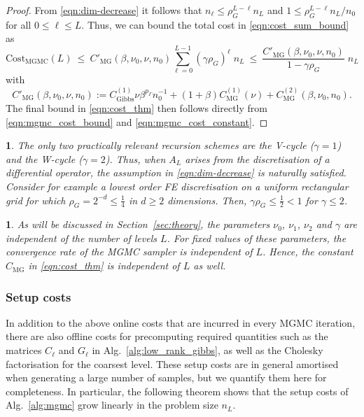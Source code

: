 \documentclass[11pt,english]{article}
\theoremstyle{plain}
\theoremstyle{plain}
\theoremstyle{plain}
\theoremstyle{plain}
\newtheorem{rem}[thm]{\protect\remarkname}
\numberwithin{equation}{section}
\newcommand{\rev}[1]{#1}
\providecommand{\remarkname}{Remark}
\begin{document}
\begin{proof}
    From \eqref{eqn:dim-decrease} it follows that $n_{\ell}\le \rho_G^{L-\ell}n_L$ and $1\le \rho_G^{L-\ell}n_{L}/n_0$ for all $0\le\ell\le L$. Thus, we can bound the total cost in \eqref{eqn:cost_sum_bound} as
    \begin{equation}
        \mathrm{Cost}_{\mathrm{MGMC}}(L) %
        \ \le \ C'_{\mathrm{MG}}(\beta,\nu_0,\nu,n_0) \sum_{\ell=0}^{L-1} (\gamma \rho_G)^{\ell} \; n_L \ \le \
        \frac{C'_{\mathrm{MG}}(\beta,\nu_0,\nu,n_0)}{1 - \gamma \rho_G} \; n_L
        \label{eqn:mgmc_cost_bound}
    \end{equation}
    with
    \begin{equation}
        C'_{\mathrm{MG}}(\beta,\nu_0,\nu,n_0) :=  C_{\mathrm{Gibbs}}^{(1)} \nu \beta^{p_\Gamma} n_0^{-1}   + \rev{(1+\beta)C_{\mathrm{MG}}^{(1)} (\nu)} + C_{\mathrm{MG}}^{(2)} (\beta,\nu_0,n_0)  .
        \label{eqn:mgmc_cost_constant}
    \end{equation}
    The final bound in \eqref{eqn:cost_thm} then follows directly from \eqref{eqn:mgmc_cost_bound} and \eqref{eqn:mgmc_cost_constant}.
\end{proof}
\begin{rem}
    The only two practically relevant recursion schemes are the V-cycle ($\gamma=1$) and the W-cycle ($\gamma=2$). Thus, when $A_L$ arises from the discretisation of a differential operator, the assumption in \eqref{eqn:dim-decrease} is naturally satisfied. Consider for example a lowest order FE discretisation on a uniform rectangular grid for which $\rho_G = 2^{-d}\le \frac{1}{4}$ in $d\ge2$ dimensions. Then, $\gamma\rho_G\le\frac{1}{2}<1$ for $\gamma\le 2$.
\end{rem}
\begin{rem}
    \rev{%
    As will be discussed in Section~\ref{sec:theory}, the parameters $\nu_0$, $\nu_1$, $\nu_2$ and $\gamma$ are independent of the number of levels $L$. For fixed values of these parameters, the convergence rate of the MGMC sampler is independent of $L$. Hence, the constant $C_{\mathrm{MG}}$ in \eqref{eqn:cost_thm} is independent of $L$ as well.}
\end{rem}
\rev{\subsubsection{Setup costs}\label{sec:mgmc_setup_costs}
  In addition to the above online costs that are incurred in every MGMC iteration, there are also offline costs for precomputing required quantities such as the matrices $C_\ell$ and $G_\ell$ in Alg.~\ref{alg:low_rank_gibbs}, as well as the Cholesky factorisation for the coarsest level. These setup costs are in general amortised when generating a large number of samples, but we quantify them here for completeness. In particular, the following theorem shows that the setup costs of Alg.~\ref{alg:mgmc} grow linearly in the problem size $n_L$.}
\end{document}
